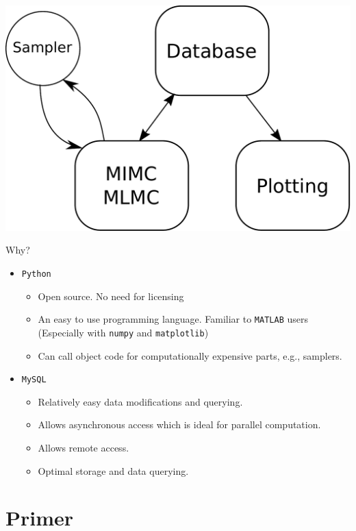 \begin{frame}
\centering
\includegraphics[scale=0.4]{src/imgs/scheme}
\end{frame}

\begin{frame}{Why?}
  \begin{itemize}
  \item \texttt{Python}
    \begin{itemize}
    \item Open source. No need for licensing
    \item An easy to use programming language. Familiar to
      \texttt{MATLAB} users (Especially with \texttt{numpy} and \texttt{matplotlib})
    \item Can call object code for computationally expensive parts,
      e.g., samplers.
    \end{itemize}
    \item \texttt{MySQL}
      \begin{itemize}
      \item Relatively easy data modifications and querying.
      \item Allows asynchronous access which is ideal for parallel computation.
      \item Allows remote access.
      \item Optimal storage and data querying.
      \end{itemize}
    \end{itemize}
\end{frame}

\section{Primer}
